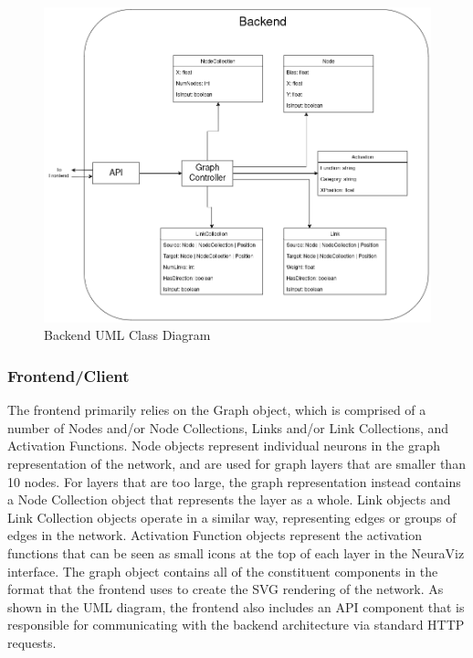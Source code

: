 \begin{figure}[!htb]
    \centering
    \includegraphics[width=1\textwidth]{../docs/diagrams/class_diagram_backend.png}
    \caption{Backend UML Class Diagram}
    \label{fig:uml_class_diagram_backend}
\end{figure}

\subsubsection{Frontend/Client}
The frontend primarily relies on the Graph object, which is comprised of a number of Nodes and/or Node Collections, Links and/or Link Collections, and Activation Functions. Node objects represent individual neurons in the graph representation of the network, and are used for graph layers that are smaller than 10 nodes. For layers that are too large, the graph representation instead contains a Node Collection object that represents the layer as a whole. Link objects and Link Collection objects operate in a similar way, representing edges or groups of edges in the network. Activation Function objects represent the activation functions that can be seen as small icons at the top of each layer in the NeuraViz interface. The graph object contains all of the constituent components in the format that the frontend uses to create the SVG rendering of the network. As shown in the UML diagram, the frontend also includes an API component that is responsible for communicating with the backend architecture via standard HTTP requests.

